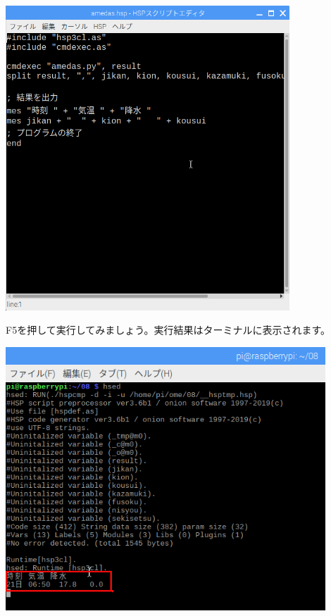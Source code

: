 \begin{center}
\includegraphics[width=0.8\textwidth]{./text08-img/textbook-img030.png}

\end{center}

\bigskip


\clearpage
F5を押して実行してみましょう。実行結果はターミナルに表示されます。



\begin{center}
\includegraphics[width=0.9\textwidth]{./text08-img/textbook-img031.png}

\end{center}

